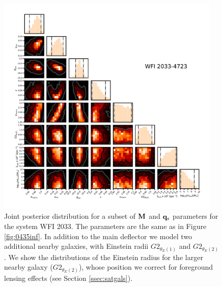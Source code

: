 \begin{figure}
	\includegraphics[clip,trim=1.5cm 1.6cm 1cm
	1cm,width=0.95\textwidth,keepaspectratio]{./figures_wdmchillsout//joint2033.pdf}
	\caption[Joint posterior distribution of model parameters for WFI 2033]{\label{fig:02033inf} Joint posterior distribution for a subset of ${\bf{M}}$ and ${\bf{q}_{\rm{s}}}$ parameters for the system WFI 2033. The parameters are the same as in Figure \ref{fig:0435inf}. In addition to the main deflector we model two additional nearby galaxies, with Einstein radii $G2_{\theta_E(1)}$ and $G2_{\theta_E(2)}$. We show the distributions of the Einstein radius for the larger nearby galaxy ($G2_{\theta_E(2)}$), whose position we correct for foreground lensing effects (see Section \ref{ssec:satgals}). }
\end{figure}	

